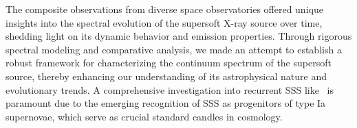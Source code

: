 		The composite observations from diverse space observatories offered unique insights into the spectral evolution of the supersoft X-ray source over time, shedding light on its dynamic behavior and emission properties. Through rigorous spectral modeling and comparative analysis, we made an attempt to establish a robust framework for characterizing the continuum spectrum of the supersoft source, thereby enhancing our understanding of its astrophysical nature and evolutionary trends. A comprehensive investigation into recurrent SSS like \source\ is paramount due to the emerging recognition of SSS as progenitors of type Ia supernovae, which serve as crucial standard candles in cosmology. %
    
